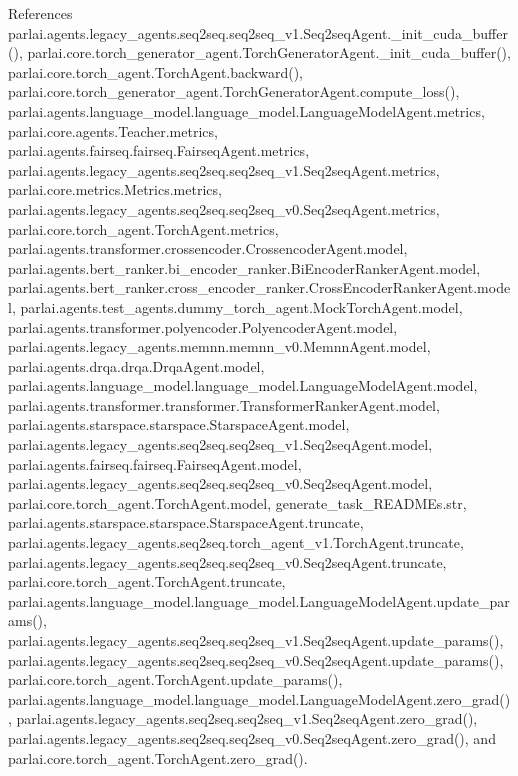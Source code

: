References parlai.\+agents.\+legacy\+\_\+agents.\+seq2seq.\+seq2seq\+\_\+v1.\+Seq2seq\+Agent.\+\_\+init\+\_\+cuda\+\_\+buffer(), parlai.\+core.\+torch\+\_\+generator\+\_\+agent.\+Torch\+Generator\+Agent.\+\_\+init\+\_\+cuda\+\_\+buffer(), parlai.\+core.\+torch\+\_\+agent.\+Torch\+Agent.\+backward(), parlai.\+core.\+torch\+\_\+generator\+\_\+agent.\+Torch\+Generator\+Agent.\+compute\+\_\+loss(), parlai.\+agents.\+language\+\_\+model.\+language\+\_\+model.\+Language\+Model\+Agent.\+metrics, parlai.\+core.\+agents.\+Teacher.\+metrics, parlai.\+agents.\+fairseq.\+fairseq.\+Fairseq\+Agent.\+metrics, parlai.\+agents.\+legacy\+\_\+agents.\+seq2seq.\+seq2seq\+\_\+v1.\+Seq2seq\+Agent.\+metrics, parlai.\+core.\+metrics.\+Metrics.\+metrics, parlai.\+agents.\+legacy\+\_\+agents.\+seq2seq.\+seq2seq\+\_\+v0.\+Seq2seq\+Agent.\+metrics, parlai.\+core.\+torch\+\_\+agent.\+Torch\+Agent.\+metrics, parlai.\+agents.\+transformer.\+crossencoder.\+Crossencoder\+Agent.\+model, parlai.\+agents.\+bert\+\_\+ranker.\+bi\+\_\+encoder\+\_\+ranker.\+Bi\+Encoder\+Ranker\+Agent.\+model, parlai.\+agents.\+bert\+\_\+ranker.\+cross\+\_\+encoder\+\_\+ranker.\+Cross\+Encoder\+Ranker\+Agent.\+model, parlai.\+agents.\+test\+\_\+agents.\+dummy\+\_\+torch\+\_\+agent.\+Mock\+Torch\+Agent.\+model, parlai.\+agents.\+transformer.\+polyencoder.\+Polyencoder\+Agent.\+model, parlai.\+agents.\+legacy\+\_\+agents.\+memnn.\+memnn\+\_\+v0.\+Memnn\+Agent.\+model, parlai.\+agents.\+drqa.\+drqa.\+Drqa\+Agent.\+model, parlai.\+agents.\+language\+\_\+model.\+language\+\_\+model.\+Language\+Model\+Agent.\+model, parlai.\+agents.\+transformer.\+transformer.\+Transformer\+Ranker\+Agent.\+model, parlai.\+agents.\+starspace.\+starspace.\+Starspace\+Agent.\+model, parlai.\+agents.\+legacy\+\_\+agents.\+seq2seq.\+seq2seq\+\_\+v1.\+Seq2seq\+Agent.\+model, parlai.\+agents.\+fairseq.\+fairseq.\+Fairseq\+Agent.\+model, parlai.\+agents.\+legacy\+\_\+agents.\+seq2seq.\+seq2seq\+\_\+v0.\+Seq2seq\+Agent.\+model, parlai.\+core.\+torch\+\_\+agent.\+Torch\+Agent.\+model, generate\+\_\+task\+\_\+\+R\+E\+A\+D\+M\+Es.\+str, parlai.\+agents.\+starspace.\+starspace.\+Starspace\+Agent.\+truncate, parlai.\+agents.\+legacy\+\_\+agents.\+seq2seq.\+torch\+\_\+agent\+\_\+v1.\+Torch\+Agent.\+truncate, parlai.\+agents.\+legacy\+\_\+agents.\+seq2seq.\+seq2seq\+\_\+v0.\+Seq2seq\+Agent.\+truncate, parlai.\+core.\+torch\+\_\+agent.\+Torch\+Agent.\+truncate, parlai.\+agents.\+language\+\_\+model.\+language\+\_\+model.\+Language\+Model\+Agent.\+update\+\_\+params(), parlai.\+agents.\+legacy\+\_\+agents.\+seq2seq.\+seq2seq\+\_\+v1.\+Seq2seq\+Agent.\+update\+\_\+params(), parlai.\+agents.\+legacy\+\_\+agents.\+seq2seq.\+seq2seq\+\_\+v0.\+Seq2seq\+Agent.\+update\+\_\+params(), parlai.\+core.\+torch\+\_\+agent.\+Torch\+Agent.\+update\+\_\+params(), parlai.\+agents.\+language\+\_\+model.\+language\+\_\+model.\+Language\+Model\+Agent.\+zero\+\_\+grad(), parlai.\+agents.\+legacy\+\_\+agents.\+seq2seq.\+seq2seq\+\_\+v1.\+Seq2seq\+Agent.\+zero\+\_\+grad(), parlai.\+agents.\+legacy\+\_\+agents.\+seq2seq.\+seq2seq\+\_\+v0.\+Seq2seq\+Agent.\+zero\+\_\+grad(), and parlai.\+core.\+torch\+\_\+agent.\+Torch\+Agent.\+zero\+\_\+grad().



